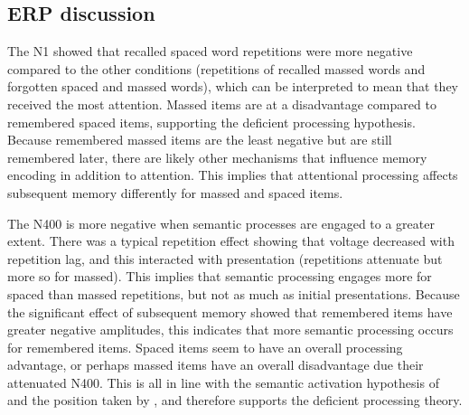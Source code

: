 
\subsection{ERP discussion}

The N1 showed that recalled spaced word repetitions were more negative compared to the other conditions (repetitions of recalled massed words and forgotten spaced and massed words), which can be interpreted to mean that they received the most attention.
Massed items are at a disadvantage compared to remembered spaced items, supporting the deficient processing hypothesis.  Because remembered massed items are the least negative but are still remembered later, there are likely other mechanisms that influence memory encoding in addition to attention.  This implies that attentional processing affects subsequent memory differently for massed and spaced items.


The N400 is more negative when semantic processes are engaged to a greater extent.  There was a typical repetition effect showing that voltage decreased with repetition lag, and this interacted with presentation (repetitions attenuate but more so for massed).  This implies that semantic processing engages more for spaced than massed repetitions, but not as much as initial presentations.
Because the significant effect of subsequent memory showed that remembered items have greater negative amplitudes, this indicates that more semantic processing occurs for remembered items.  Spaced items seem to have an overall processing advantage, or perhaps massed items have an overall disadvantage due their attenuated N400.  This is all in line with the semantic activation hypothesis of  and the position taken by , and therefore supports the deficient processing theory.

